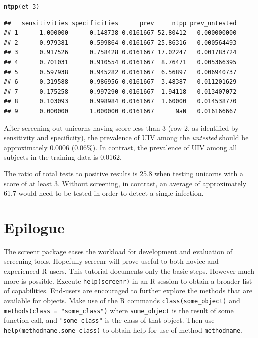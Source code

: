 \documentclass[11pt]{report}\usepackage[]{graphicx}\usepackage[]{xcolor}
\makeatletter
\newcommand{\hlstd}[1]{\textcolor[rgb]{0.345,0.345,0.345}{#1}}%
\newcommand{\hlkwd}[1]{\textcolor[rgb]{0.737,0.353,0.396}{\textbf{#1}}}%
\newenvironment{kframe}{%
 \def\at@end@of@kframe{}%
 \ifinner\ifhmode%
  \def\at@end@of@kframe{\end{minipage}}%
  \begin{minipage}{\columnwidth}%
 \fi\fi%
 \def\FrameCommand##1{\hskip\@totalleftmargin \hskip-\fboxsep
 \colorbox{shadecolor}{##1}\hskip-\fboxsep
     \hskip-\linewidth \hskip-\@totalleftmargin \hskip\columnwidth}%
 \MakeFramed {\advance\hsize-\width
   \@totalleftmargin\z@ \linewidth\hsize
   \@setminipage}}%
 {\par\unskip\endMakeFramed%
 \at@end@of@kframe}
\newenvironment{knitrout}{}{} %
\makeatother
\begin{document}
\begin{knitrout}
\color{fgcolor}\begin{kframe}
\begin{alltt}
\hlkwd{ntpp}\hlstd{(et_3)}
\end{alltt}


{\ttfamily\noindent\itshape{}}\begin{verbatim}
##   sensitivities specificities      prev     ntpp prev_untested
## 1      1.000000      0.148738 0.0161667 52.80412   0.000000000
## 2      0.979381      0.599864 0.0161667 25.86316   0.000564493
## 3      0.917526      0.758428 0.0161667 17.02247   0.001783724
## 4      0.701031      0.910554 0.0161667  8.76471   0.005366395
## 5      0.597938      0.945282 0.0161667  6.56897   0.006940737
## 6      0.319588      0.986956 0.0161667  3.48387   0.011201629
## 7      0.175258      0.997290 0.0161667  1.94118   0.013407072
## 8      0.103093      0.998984 0.0161667  1.60000   0.014538770
## 9      0.000000      1.000000 0.0161667      NaN   0.016166667
\end{verbatim}
\end{kframe}
\end{knitrout}


After screening out unicorns having score less than 3 (row 2, as
identified by sensitivity and specificity), the prevalence of UIV
among the \emph{untested} should be approximately 0.0006 (0.06\%). In
contrast, the prevalence of UIV among all subjects in the training
data is 0.0162.

The ratio of total tests to positive results is 25.8 when testing
unicorns with a score of at least 3. Without screening, in contrast,
an average of approximately
61.7 would need to be tested in order to
detect a single infection.


\section*{Epilogue}

The \textsf{screenr} package eases the workload for development and
evaluation of screening tools. Hopefully \textsf{screenr} will prove useful
to both novice and experienced \textsf{R} users. This tutorial documents only
the basic steps. However much more is possible. Execute
\verb|help(screenr)| in an \textsf{R} session to obtain a broader list of
capabilities. End-users are encouraged to further explore the methods
that are available for objects. Make use of the \textsf{R} commands
\verb|class(some_object)| and \verb|methods(class = "some_class")| where
\verb|some_object| is the result of some function call, and \verb|"some_class"|
is the class of that object. Then use \verb|help(methodname.some_class)| to
obtain help for use of method \verb|methodname|.
\end{document}
